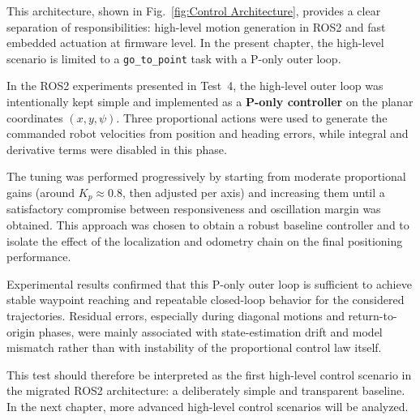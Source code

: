 This architecture, shown in Fig.~\ref{fig:Control Architecture}, provides a clear separation of responsibilities: high-level motion generation in ROS2 and fast embedded actuation at firmware level. In the present chapter, the high-level scenario is limited to a \texttt{go\_to\_point} task with a P-only outer loop.

In the ROS2 experiments presented in Test~4, the high-level outer loop was intentionally kept simple and implemented as a \textbf{P-only controller} on the planar coordinates \((x,y,\psi)\). Three proportional actions were used to generate the commanded robot velocities from position and heading errors, while integral and derivative terms were disabled in this phase.

The tuning was performed progressively by starting from moderate proportional gains (around \(K_p \approx 0.8\), then adjusted per axis) and increasing them until a satisfactory compromise between responsiveness and oscillation margin was obtained. This approach was chosen to obtain a robust baseline controller and to isolate the effect of the localization and odometry chain on the final positioning performance.

Experimental results confirmed that this P-only outer loop is sufficient to achieve stable waypoint reaching and repeatable closed-loop behavior for the considered trajectories. Residual errors, especially during diagonal motions and return-to-origin phases, were mainly associated with state-estimation drift and model mismatch rather than with instability of the proportional control law itself.

This test should therefore be interpreted as the first high-level control scenario in the migrated ROS2 architecture: a deliberately simple and transparent baseline. In the next chapter, more advanced high-level control scenarios will be analyzed.


  

